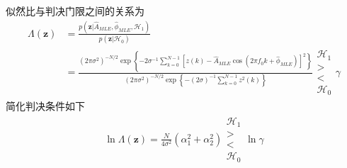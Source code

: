 \documentclass[fontset=windows]{article}
\numberwithin{figure}{section}
\begin{document}
似然比与判决门限之间的关系为
\begin{align*}
	\Lambda(\mathbf{z})
	 & =\frac{p(\mathbf{z}|\hat{A}_{MLE},\hat{\phi}_{MLE},\mathcal{H}_1)}{p(\mathbf{z}|\mathcal{H}_0)}                                                                                                                                    \\
	 & =\frac{(2\pi \sigma^2)^{-N/2}\exp\left\{-2\sigma^{-1}\sum_{k=0}^{N-1}\left[z(k)-\hat{A}_{MLE}\cos(2\pi f_0k+\hat{\phi}_{MLE})\right]^2 \right\}}{(2\pi \sigma^2)^{-N/2}\exp\left\{-(2\sigma)^{-1} \sum_{k=0}^{N-1}z^2(k) \right\}}
	\begin{matrix}
		\mathcal{H}_1 \\>\\<\\\mathcal{H}_0
	\end{matrix}
	\gamma
\end{align*}
简化判决条件如下
\begin{align*}
	\ln \Lambda(\mathbf{z})=\frac{N}{4\sigma^2}(\alpha^2_1+\alpha^2_2)
	\begin{matrix}
		\mathcal{H}_1 \\>\\<\\\mathcal{H}_0
	\end{matrix}
	\ln\gamma
\end{align*}
\end{document}
